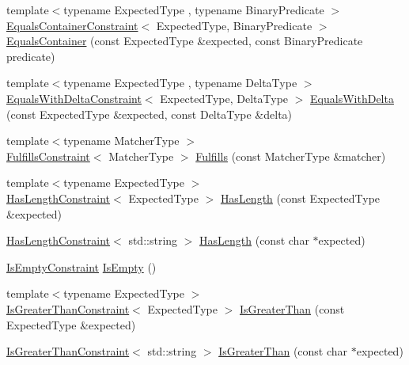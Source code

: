 \begin{DoxyCompactItemize}
\item 
{\footnotesize template$<$typename Expected\+Type , typename Binary\+Predicate $>$ }\\\mbox{\hyperlink{structsnowhouse_1_1EqualsContainerConstraint}{Equals\+Container\+Constraint}}$<$ Expected\+Type, Binary\+Predicate $>$ \mbox{\hyperlink{namespacesnowhouse_af47dd2afd340aafb14bc831a0b7cd568}{Equals\+Container}} (const Expected\+Type \&expected, const Binary\+Predicate predicate)
\item 
{\footnotesize template$<$typename Expected\+Type , typename Delta\+Type $>$ }\\\mbox{\hyperlink{structsnowhouse_1_1EqualsWithDeltaConstraint}{Equals\+With\+Delta\+Constraint}}$<$ Expected\+Type, Delta\+Type $>$ \mbox{\hyperlink{namespacesnowhouse_acfa1166262faee83b9871f0037d00208}{Equals\+With\+Delta}} (const Expected\+Type \&expected, const Delta\+Type \&delta)
\item 
{\footnotesize template$<$typename Matcher\+Type $>$ }\\\mbox{\hyperlink{structsnowhouse_1_1FulfillsConstraint}{Fulfills\+Constraint}}$<$ Matcher\+Type $>$ \mbox{\hyperlink{namespacesnowhouse_a776dc7f3d94c1d13eaeed62e7235d026}{Fulfills}} (const Matcher\+Type \&matcher)
\item 
{\footnotesize template$<$typename Expected\+Type $>$ }\\\mbox{\hyperlink{structsnowhouse_1_1HasLengthConstraint}{Has\+Length\+Constraint}}$<$ Expected\+Type $>$ \mbox{\hyperlink{namespacesnowhouse_af480379a538a0aac57f15bc8ccf25af5}{Has\+Length}} (const Expected\+Type \&expected)
\item 
\mbox{\hyperlink{structsnowhouse_1_1HasLengthConstraint}{Has\+Length\+Constraint}}$<$ std\+::string $>$ \mbox{\hyperlink{namespacesnowhouse_a576ebffd6d82b5d2a3dba195e0ca7741}{Has\+Length}} (const char $\ast$expected)
\item 
\mbox{\hyperlink{structsnowhouse_1_1IsEmptyConstraint}{Is\+Empty\+Constraint}} \mbox{\hyperlink{namespacesnowhouse_abace5291129c2c329e287fad2a8344a2}{Is\+Empty}} ()
\item 
{\footnotesize template$<$typename Expected\+Type $>$ }\\\mbox{\hyperlink{structsnowhouse_1_1IsGreaterThanConstraint}{Is\+Greater\+Than\+Constraint}}$<$ Expected\+Type $>$ \mbox{\hyperlink{namespacesnowhouse_a80f7a2eb02ff7f4cedaa75d3a2c87f18}{Is\+Greater\+Than}} (const Expected\+Type \&expected)
\item 
\mbox{\hyperlink{structsnowhouse_1_1IsGreaterThanConstraint}{Is\+Greater\+Than\+Constraint}}$<$ std\+::string $>$ \mbox{\hyperlink{namespacesnowhouse_ac0bbd15e81a1cb4bc6dbd5602293ae6a}{Is\+Greater\+Than}} (const char $\ast$expected)

\end{DoxyCompactItemize}
